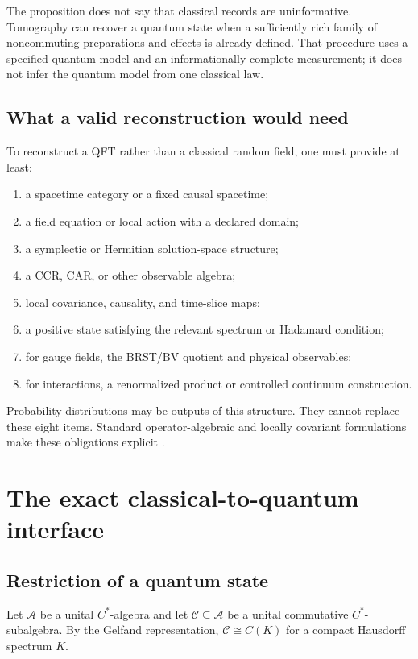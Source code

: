 \documentclass[11pt]{article}
\newcommand{\A}{\mathcal A}
\newcommand{\C}{\mathcal C}
\begin{document}
The proposition does not say that classical records are uninformative.
Tomography can recover a quantum state when a sufficiently rich family of
noncommuting preparations and effects is already defined.  That procedure
uses a specified quantum model and an informationally complete
measurement; it does not infer the quantum model from one classical law.

\subsection{What a valid reconstruction would need}

To reconstruct a QFT rather than a classical random field, one must provide
at least:
\begin{enumerate}
\item a spacetime category or a fixed causal spacetime;
\item a field equation or local action with a declared domain;
\item a symplectic or Hermitian solution-space structure;
\item a CCR, CAR, or other observable algebra;
\item local covariance, causality, and time-slice maps;
\item a positive state satisfying the relevant spectrum or Hadamard
condition;
\item for gauge fields, the BRST/BV quotient and physical observables;
\item for interactions, a renormalized product or controlled continuum
construction.
\end{enumerate}
Probability distributions may be outputs of this structure.  They cannot
replace these eight items.  Standard operator-algebraic and locally
covariant formulations make these obligations explicit
\cite{bratteli_robinson,haag,fewster_rejzner}.

\section{The exact classical-to-quantum interface}

\subsection{Restriction of a quantum state}

Let \(\A\) be a unital \(C^*\)-algebra and let
\(\C\subseteq\A\) be a unital commutative \(C^*\)-subalgebra.  By the
Gelfand representation, \(\C\cong C(K)\) for a compact Hausdorff spectrum
\(K\).
\end{document}
